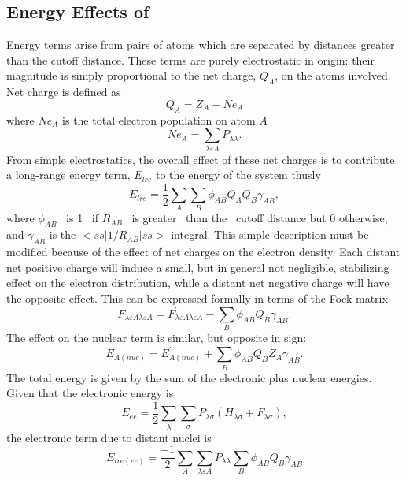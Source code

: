 \subsection{Energy Effects of }
Energy terms arise from pairs of atoms which are separated by distances greater
than the cutoff distance.  These terms are purely electrostatic in origin:
their magnitude is simply proportional to the net charge, $Q_A$, on the atoms
involved.  Net charge is defined as 
\begin{equation}
Q_A = Z_A-Ne_A
\end{equation}
where $Ne_A$ is the total electron population on atom $A$ 
\begin{equation}
Ne_A=\sum_{\lambda\varepsilon A}P_{\lambda \lambda}.
\end{equation}
From simple electrostatics, the overall effect of these net charges is to
contribute a long-range energy term, $E_{lre}$ to the energy of the system
thusly 
\begin{equation}
 E_{lre} = \frac{1}{2}\sum_A\sum_B\phi_{AB}Q_AQ_B\gamma_{AB},
\end{equation}
where $\phi_{AB}$ \ is 1 \ if $R_{AB}$ \ is greater \ than the
\ cutoff distance but
0 otherwise, and $\gamma_{AB}$ is the $<ss|1/R_{AB}|ss>$ integral.
This simple description must be modified because of the effect of net
charges on the electron density.  Each distant net positive charge will induce
a small, but in general not negligible, stabilizing effect on the electron
distribution, while a distant net negative charge will have the opposite
effect.  This can be expressed formally in terms of the Fock matrix 
\begin{equation}
F_{\lambda\varepsilon A \lambda\varepsilon A} =
F_{\lambda\varepsilon A \lambda\varepsilon A}^{'}-\sum_B\phi_{AB}Q_B\gamma_{AB}.
\end{equation}
The effect on the nuclear term is similar, but opposite in sign:
\begin{equation}
E_{A(nuc)}=E_{A(nuc)}^{'}+\sum_B\phi_{AB}Q_BZ_A\gamma_{AB}.
\end{equation}
The total energy is given by the sum of the electronic plus nuclear energies.
Given that the electronic energy is 
\begin{equation}
E_{ee}=\frac{1}{2}\sum_{\lambda}\sum_{\sigma}P_{\lambda \sigma}
(H_{\lambda \sigma}+F_{\lambda \sigma}),
\end{equation}
the electronic term due to distant nuclei is
\begin{equation}
E_{lre(ee)}=\frac{-1}{2}\sum_A\sum_{\lambda\varepsilon A}P_{\lambda \lambda}\sum_B\phi_{AB}Q_B\gamma_{AB}
\end{equation}
